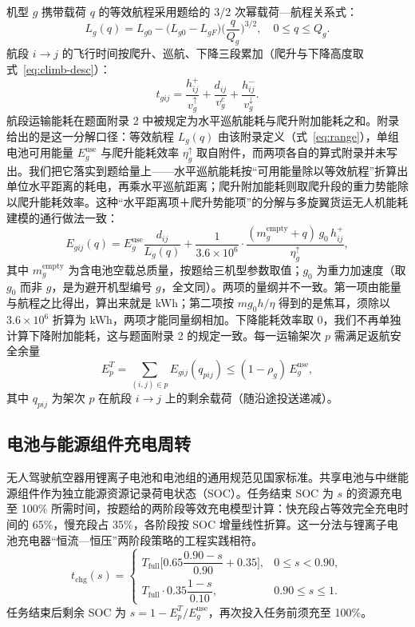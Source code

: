 机型 $g$ 携带载荷 $q$ 的等效航程采用题给的 3/2 次幂载荷—航程关系式：
\begin{equation}
	L_g(q)=L_{g0}-\big(L_{g0}-L_{gF}\big)\Big(\frac{q}{Q_g}\Big)^{3/2},\quad 0\le q\le Q_g.
	\label{eq:range}
\end{equation}
航段 $i\to j$ 的飞行时间按爬升、巡航、下降三段累加（爬升与下降高度取式~\eqref{eq:climb-desc}）：
\begin{equation}
	t_{gij}=\frac{h^{+}_{ij}}{v^{\uparrow}_g}+\frac{d_{ij}}{v^{c}_g}+\frac{h^{-}_{ij}}{v^{\downarrow}_g}.
	\label{eq:flight-time}
\end{equation}
航段运输能耗在题面附录 2 中被规定为水平巡航能耗与爬升附加能耗之和。附录给出的是这一分解口径：等效航程 $L_g(q)$ 由该附录定义（式~\eqref{eq:range}），单组电池可用能量 $E_g^{\mathrm{use}}$ 与爬升能耗效率 $\eta^{\uparrow}_g$ 取自附件，而两项各自的算式附录并未写出。我们把它落实到题给量上——水平巡航能耗按“可用能量除以等效航程”折算出单位水平距离的耗电，再乘水平巡航距离；爬升附加能耗则取爬升段的重力势能除以爬升能耗效率。这种“水平距离项＋爬升势能项”的分解与多旋翼货运无人机能耗建模的通行做法一致\cite{zhang2021energy}：
\begin{equation}
	E_{gij}(q)=E_g^{\mathrm{use}}\frac{d_{ij}}{L_g(q)}
	+\frac{1}{3.6\times10^{6}}\cdot\frac{(m_g^{\mathrm{empty}}+q)\,g_0\,h^{+}_{ij}}{\eta^{\uparrow}_g},
	\label{eq:leg-energy}
\end{equation}
其中 $m_g^{\mathrm{empty}}$ 为含电池空载总质量，按题给三机型参数取值\cite{dji2024m350}；$g_0$ 为重力加速度（取 $g_0$ 而非 $g$，是为避开机型编号 $g$，全文同）。两项的量纲并不一致。第一项由能量与航程之比得出，算出来就是 kWh；第二项按 $m g_0 h/\eta$ 得到的是焦耳，须除以 $3.6\times10^{6}$ 折算为 kWh，两项才能同量纲相加。下降能耗效率取 0，我们不再单独计算下降附加能耗，这与题面附录 2 的规定一致。每一运输架次 $p$ 需满足返航安全余量
\begin{equation}
	E_p^{T}=\sum_{(i,j)\in p}E_{gij}(q_{pij})\le (1-\rho_g)\,E_g^{\mathrm{use}},
	\label{eq:energy-margin}
\end{equation}
其中 $q_{pij}$ 为架次 $p$ 在航段 $i\to j$ 上的剩余载荷（随沿途投送递减）。

\subsection{电池与能源组件充电周转}

无人驾驶航空器用锂离子电池和电池组的通用规范见国家标准\cite{samr2025uavbattery}。共享电池与中继能源组件作为独立能源资源记录荷电状态（SOC）。任务结束 SOC 为 $s$ 的资源充电至 100\% 所需时间，按题给的两阶段等效充电模型计算：快充段占等效完全充电时间的 65\%，慢充段占 35\%，各阶段按 SOC 增量线性折算。这一分法与锂离子电池充电器“恒流—恒压”两阶段策略的工程实践相符\cite{ti2017charger}。
\begin{equation}
	t_{\mathrm{chg}}(s)=
	\begin{cases}
		T_{\mathrm{full}}\Big[0.65\dfrac{0.90-s}{0.90}+0.35\Big], & 0\le s<0.90,\\[4pt]
		T_{\mathrm{full}}\cdot 0.35\dfrac{1-s}{0.10}, & 0.90\le s\le 1.
	\end{cases}
	\label{eq:charging}
\end{equation}
任务结束后剩余 SOC 为 $s=1-E_p^{T}/E_g^{\mathrm{use}}$，再次投入任务前须充至 100\%。

